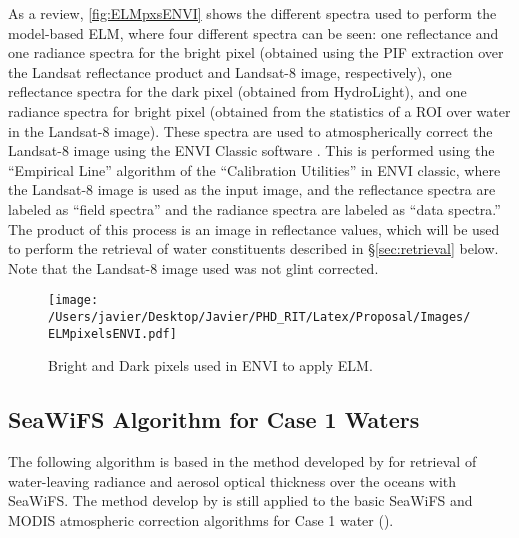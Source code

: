 
As a review, \autoref{fig:ELMpxsENVI} shows the different spectra used to perform the model-based ELM, where four different spectra can be seen: one reflectance and one radiance spectra for the bright pixel (obtained using the PIF extraction over the Landsat reflectance product and Landsat-8 image, respectively), one reflectance spectra for the dark pixel (obtained from HydroLight), and one radiance spectra for bright pixel (obtained from the statistics of a ROI over water in the Landsat-8 image). These spectra are used to atmospherically correct the Landsat-8 image using the ENVI Classic software \cite{ENVIUserGuide}. This is performed using the ``Empirical Line'' algorithm of the ``Calibration Utilities'' in ENVI classic, where the Landsat-8 image is used as the input image, and the reflectance spectra are labeled as ``field spectra'' and the radiance spectra are labeled as ``data spectra.'' The product of this process is an image in reflectance values, which will be used to perform the retrieval of water constituents described in \S\ref{sec:retrieval} below. Note that the Landsat-8 image used was not glint corrected.

\begin{figure}[htb]
  \centering
  \texttt{[image: /Users/javier/Desktop/Javier/PHD\_RIT/Latex/Proposal/Images/ELMpixelsENVI.pdf]}
  \caption{Bright and Dark pixels used in ENVI to apply ELM. \label{fig:ELMpxsENVI} } 
\end{figure}

\subsection{SeaWiFS Algorithm for Case 1 Waters}
\label{subsec:gordon}
The following algorithm is based in the method developed by \cite{Gordon:1994} for retrieval of water-leaving radiance and aerosol optical thickness over the oceans with SeaWiFS. The method develop by \cite{Gordon:1994} is still applied to the basic SeaWiFS and MODIS atmospheric correction algorithms for Case 1 water (\cite{IOCCG:2010}).

